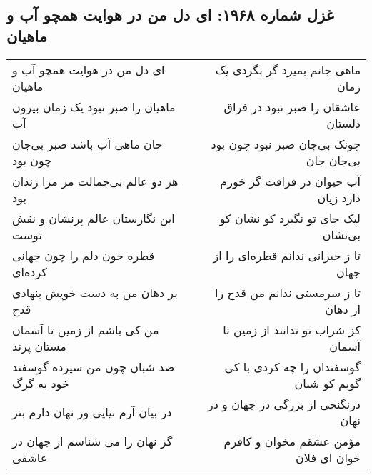 \begin{center}
\section*{غزل شماره ۱۹۶۸: ای دل من در هوایت همچو آب و ماهیان}
\label{sec:1968}
\begin{longtable}{l p{0.5cm} r}
ای دل من در هوایت همچو آب و ماهیان
&&
ماهی جانم بمیرد گر بگردی یک زمان
\\
ماهیان را صبر نبود یک زمان بیرون آب
&&
عاشقان را صبر نبود در فراق دلستان
\\
جان ماهی آب باشد صبر بی‌جان چون بود
&&
چونک بی‌جان صبر نبود چون بود بی‌جان جان
\\
هر دو عالم بی‌جمالت مر مرا زندان بود
&&
آب حیوان در فراقت گر خورم دارد زیان
\\
این نگارستان عالم پرنشان و نقش توست
&&
لیک جای تو نگیرد کو نشان کو بی‌نشان
\\
قطره خون دلم را چون جهانی کرده‌ای
&&
تا ز حیرانی ندانم قطره‌ای را از جهان
\\
بر دهان من به دست خویش بنهادی قدح
&&
تا ز سرمستی ندانم من قدح را از دهان
\\
من کی باشم از زمین تا آسمان مستان پرند
&&
کز شراب تو ندانند از زمین تا آسمان
\\
صد شبان چون من سپرده گوسفند خود به گرگ
&&
گوسفندان را چه کردی با کی گویم کو شبان
\\
در بیان آرم نیایی ور نهان دارم بتر
&&
درنگنجی از بزرگی در جهان و در نهان
\\
گر نهان را می شناسم از جهان در عاشقی
&&
مؤمن عشقم مخوان و کافرم خوان ای فلان
\\
\end{longtable}
\end{center}
